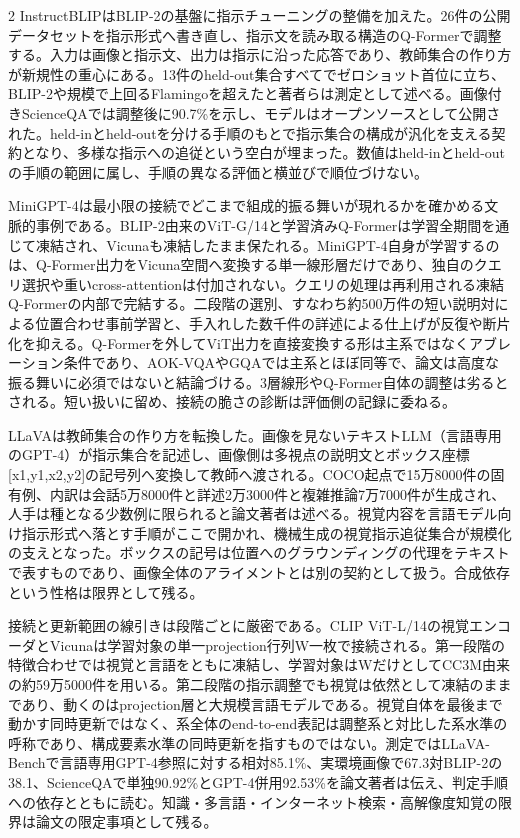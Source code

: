 \documentclass[lualatex,a4paper,10pt]{jlreq}
\begin{document}
\begin{multicols}{2}
\noindent InstructBLIPはBLIP-2の基盤に指示チューニングの整備を加えた。26件の公開データセットを指示形式へ書き直し、指示文を読み取る構造のQ-Formerで調整する。入力は画像と指示文、出力は指示に沿った応答であり、教師集合の作り方が新規性の重心にある。13件のheld-out集合すべてでゼロショット首位に立ち、BLIP-2や規模で上回るFlamingoを超えたと著者らは測定として述べる。画像付きScienceQAでは調整後に90.7\%を示し、モデルはオープンソースとして公開された。held-inとheld-outを分ける手順のもとで指示集合の構成が汎化を支える契約となり、多様な指示への追従という空白が埋まった。数値はheld-inとheld-outの手順の範囲に属し、手順の異なる評価と横並びで順位づけない。\autocite{vmd060}\par\medskip
\noindent MiniGPT-4は最小限の接続でどこまで組成的振る舞いが現れるかを確かめる文脈的事例である。BLIP-2由来のViT-G/14と学習済みQ-Formerは学習全期間を通じて凍結され、Vicunaも凍結したまま保たれる。MiniGPT-4自身が学習するのは、Q-Former出力をVicuna空間へ変換する単一線形層だけであり、独自のクエリ選択や重いcross-attentionは付加されない。クエリの処理は再利用される凍結Q-Formerの内部で完結する。二段階の選別、すなわち約500万件の短い説明対による位置合わせ事前学習と、手入れした数千件の詳述による仕上げが反復や断片化を抑える。Q-Formerを外してViT出力を直接変換する形は主系ではなくアブレーション条件であり、AOK-VQAやGQAでは主系とほぼ同等で、論文は高度な振る舞いに必須ではないと結論づける。3層線形やQ-Former自体の調整は劣るとされる。短い扱いに留め、接続の脆さの診断は評価側の記録に委ねる。\autocite{vmd061}\par\medskip
\noindent LLaVAは教師集合の作り方を転換した。画像を見ないテキストLLM（言語専用のGPT-4）が指示集合を記述し、画像側は多視点の説明文とボックス座標[x1,y1,x2,y2]の記号列へ変換して教師へ渡される。COCO起点で15万8000件の固有例、内訳は会話5万8000件と詳述2万3000件と複雑推論7万7000件が生成され、人手は種となる少数例に限られると論文著者は述べる。視覚内容を言語モデル向け指示形式へ落とす手順がここで開かれ、機械生成の視覚指示追従集合が規模化の支えとなった。ボックスの記号は位置へのグラウンディングの代理をテキストで表すものであり、画像全体のアライメントとは別の契約として扱う。合成依存という性格は限界として残る。\autocite{vmd062}\par\medskip
\noindent 接続と更新範囲の線引きは段階ごとに厳密である。CLIP ViT-L/14の視覚エンコーダとVicunaは学習対象の単一projection行列W一枚で接続される。第一段階の特徴合わせでは視覚と言語をともに凍結し、学習対象はWだけとしてCC3M由来の約59万5000件を用いる。第二段階の指示調整でも視覚は依然として凍結のままであり、動くのはprojection層と大規模言語モデルである。視覚自体を最後まで動かす同時更新ではなく、系全体のend-to-end表記は調整系と対比した系水準の呼称であり、構成要素水準の同時更新を指すものではない。測定ではLLaVA-Benchで言語専用GPT-4参照に対する相対85.1\%、実環境画像で67.3対BLIP-2の38.1、ScienceQAで単独90.92\%とGPT-4併用92.53\%を論文著者は伝え、判定手順への依存とともに読む。知識・多言語・インターネット検索・高解像度知覚の限界は論文の限定事項として残る。\autocite{vmd062}\par\medskip

\end{multicols}
\end{document}
